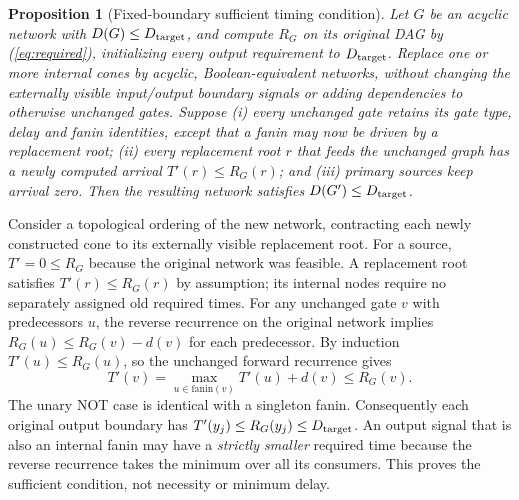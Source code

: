 \documentclass[journal,10pt]{IEEEtran}
\newtheorem{proposition}{Proposition}
\begin{document}
\begin{proposition}[Fixed-boundary sufficient timing condition]
Let $G$ be an acyclic network with $D(G)\le D_{\rm target}$, and compute $R_G$ on its \emph{original} DAG by (\ref{eq:required}), initializing every output requirement to $D_{\rm target}$. Replace one or more internal cones by acyclic, Boolean-equivalent networks, without changing the externally visible input/output boundary signals or adding dependencies to otherwise unchanged gates. Suppose (i) every unchanged gate retains its gate type, delay and fanin identities, except that a fanin may now be driven by a replacement root; (ii) every replacement root $r$ that feeds the unchanged graph has a newly computed arrival $T'(r)\le R_G(r)$; and (iii) primary sources keep arrival zero. Then the resulting network satisfies $D(G')\le D_{\rm target}$.
\end{proposition}
\begin{IEEEproof}
Consider a topological ordering of the new network, contracting each newly constructed cone to its externally visible replacement root. For a source, $T'=0\le R_G$ because the original network was feasible. A replacement root satisfies $T'(r)\le R_G(r)$ by assumption; its internal nodes require no separately assigned old required times. For any unchanged gate $v$ with predecessors $u$, the reverse recurrence on the original network implies $R_G(u)\le R_G(v)-d(v)$ for each predecessor. By induction $T'(u)\le R_G(u)$, so the unchanged forward recurrence gives
\[
T'(v)=\max_{u\in\mathrm{fanin}(v)}T'(u)+d(v)\le R_G(v).
\]
The unary NOT case is identical with a singleton fanin. Consequently each original output boundary has $T'(y_j)\le R_G(y_j)\le D_{\rm target}$. An output signal that is also an internal fanin may have a \emph{strictly smaller} required time because the reverse recurrence takes the minimum over all its consumers. This proves the sufficient condition, not necessity or minimum delay.
\end{IEEEproof}
\end{document}
